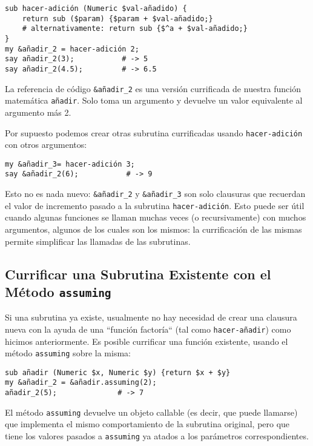 \begin{verbatim}
sub hacer-adición (Numeric $val-añadido) {
    return sub ($param) {$param + $val-añadido;}    
    # alternativamente: return sub {$^a + $val-añadido;}
}
my &añadir_2 = hacer-adición 2;
say añadir_2(3);           # -> 5
say añadir_2(4.5);         # -> 6.5
\end{verbatim}

La referencia de código \verb|&añadir_2| es una versión currificada
de nuestra función matemática {\tt añadir}. Solo toma un
argumento y devuelve un valor equivalente al argumento más 2.

Por supuesto podemos crear otras subrutina currificadas usando
{\tt hacer-adición} con otros argumentos:

\begin{verbatim}
my &añadir_3= hacer-adición 3;
say &añadir_2(6);           # -> 9
\end{verbatim}

Esto no es nada nuevo: \verb|&añadir_2| y \verb|&añadir_3|
son solo clausuras que recuerdan el valor de incremento
pasado a la subrutina {\tt hacer-adición}. Esto puede
ser útil cuando algunas funciones se llaman muchas veces
(o recursivamente) con muchos argumentos, algunos de los
cuales son los mismos: la currificación de las mismas
permite simplificar las llamadas de las subrutinas.

\subsection{Currificar una Subrutina Existente con el Método {\tt assuming}}

Si una subrutina ya existe, usualmente no hay necesidad de
crear una clausura nueva con la ayuda 
de una ``función factoría`` (tal como {\tt hacer-añadir}) 
como hicimos anteriormente. Es posible currificar una función
existente, usando el método {\tt assuming} sobre la misma:

\begin{verbatim}
sub añadir (Numeric $x, Numeric $y) {return $x + $y}   
my &añadir_2 = &añadir.assuming(2);                       
añadir_2(5);              # -> 7                                     
\end{verbatim}

El método {\tt assuming} devuelve un objeto callable (es decir,
que puede llamarse) que implementa el mismo comportamiento de
la subrutina original, pero que tiene los valores pasados
a {\tt assuming} ya atados a los parámetros correspondientes.

